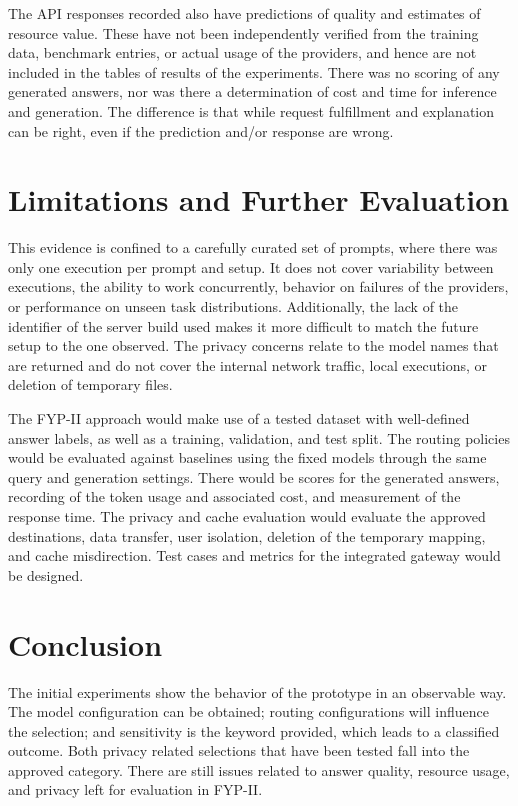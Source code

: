 The API responses recorded also have predictions of quality and estimates of resource value. These have not been independently verified from the training data, benchmark entries, or actual usage of the providers, and hence are not included in the tables of results of the experiments. There was no scoring of any generated answers, nor was there a determination of cost and time for inference and generation. The difference is that while request fulfillment and explanation can be right, even if the prediction and/or response are wrong.

\section{Limitations and Further Evaluation}
This evidence is confined to a carefully curated set of prompts, where there was only one execution per prompt and setup. It does not cover variability between executions, the ability to work concurrently, behavior on failures of the providers, or performance on unseen task distributions. Additionally, the lack of the identifier of the server build used makes it more difficult to match the future setup to the one observed. The privacy concerns relate to the model names that are returned and do not cover the internal network traffic, local executions, or deletion of temporary files.

The FYP-II approach would make use of a tested dataset with well-defined answer labels, as well as a training, validation, and test split. The routing policies would be evaluated against baselines using the fixed models through the same query and generation settings. There would be scores for the generated answers, recording of the token usage and associated cost, and measurement of the response time. The privacy and cache evaluation would evaluate the approved destinations, data transfer, user isolation, deletion of the temporary mapping, and cache misdirection. Test cases and metrics for the integrated gateway would be designed.

\section{Conclusion}
The initial experiments show the behavior of the prototype in an observable way. The model configuration can be obtained; routing configurations will influence the selection; and sensitivity is the keyword provided, which leads to a classified outcome. Both privacy related selections that have been tested fall into the approved category. There are still issues related to answer quality, resource usage, and privacy left for evaluation in FYP-II.

